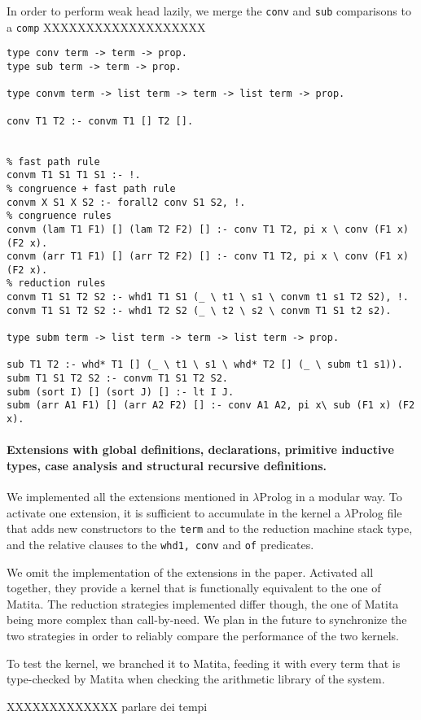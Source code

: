 In order to perform weak head lazily, we merge the \verb+conv+ and \verb+sub+ comparisons to a \verb+comp+
XXXXXXXXXXXXXXXXXXX

\begin{verbatim}
type conv term -> term -> prop.
type sub term -> term -> prop.

type convm term -> list term -> term -> list term -> prop.

conv T1 T2 :- convm T1 [] T2 [].


% fast path rule
convm T1 S1 T1 S1 :- !.
% congruence + fast path rule
convm X S1 X S2 :- forall2 conv S1 S2, !.
% congruence rules
convm (lam T1 F1) [] (lam T2 F2) [] :- conv T1 T2, pi x \ conv (F1 x) (F2 x).
convm (arr T1 F1) [] (arr T2 F2) [] :- conv T1 T2, pi x \ conv (F1 x) (F2 x).
% reduction rules
convm T1 S1 T2 S2 :- whd1 T1 S1 (_ \ t1 \ s1 \ convm t1 s1 T2 S2), !.
convm T1 S1 T2 S2 :- whd1 T2 S2 (_ \ t2 \ s2 \ convm T1 S1 t2 s2).

type subm term -> list term -> term -> list term -> prop.

sub T1 T2 :- whd* T1 [] (_ \ t1 \ s1 \ whd* T2 [] (_ \ subm t1 s1)).
subm T1 S1 T2 S2 :- convm T1 S1 T2 S2.
subm (sort I) [] (sort J) [] :- lt I J.
subm (arr A1 F1) [] (arr A2 F2) [] :- conv A1 A2, pi x\ sub (F1 x) (F2 x).
\end{verbatim}

\paragraph{Extensions with global definitions, declarations, primitive inductive types, case analysis and structural recursive definitions.}
We implemented all the extensions mentioned in $\lambda$Prolog in a modular way. To activate one extension, it is sufficient to accumulate in the kernel a $\lambda$Prolog file that adds new constructors to the \verb+term+ and to the reduction machine stack type, and the relative clauses to the \verb+whd1, conv+ and \verb+of+ predicates.

We omit the implementation of the extensions in the paper. Activated all together, they provide a kernel that is functionally equivalent to the one of Matita. The reduction strategies implemented differ though, the one of Matita being more complex than call-by-need. We plan in the future to synchronize the two strategies in order to reliably compare the performance of the two kernels.

To test the kernel, we branched it to Matita, feeding it with every term that is type-checked by Matita when checking the arithmetic library of the system.

XXXXXXXXXXXXX parlare dei tempi

